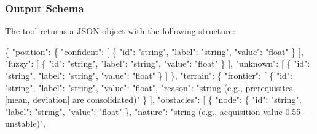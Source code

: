 \documentclass[
]{article}
\newenvironment{Shaded}{}{}
\newcommand{\DataTypeTok}[1]{\textcolor[rgb]{0.56,0.13,0.00}{#1}}
\newcommand{\FunctionTok}[1]{\textcolor[rgb]{0.02,0.16,0.49}{#1}}
\newcommand{\OtherTok}[1]{\textcolor[rgb]{0.00,0.44,0.13}{#1}}
\newcommand{\StringTok}[1]{\textcolor[rgb]{0.25,0.44,0.63}{#1}}
\begin{document}
\subsubsection{Output Schema}\label{output-schema}

The tool returns a JSON object with the following structure:

\begin{Shaded}
\begin{Highlighting}[]
\FunctionTok{\{}
  \DataTypeTok{"position"}\FunctionTok{:} \FunctionTok{\{}
    \DataTypeTok{"confident"}\FunctionTok{:} \OtherTok{[} \FunctionTok{\{} \DataTypeTok{"id"}\FunctionTok{:} \StringTok{"string"}\FunctionTok{,} \DataTypeTok{"label"}\FunctionTok{:} \StringTok{"string"}\FunctionTok{,} \DataTypeTok{"value"}\FunctionTok{:} \StringTok{"float"} \FunctionTok{\}} \OtherTok{]}\FunctionTok{,}
    \DataTypeTok{"fuzzy"}\FunctionTok{:}     \OtherTok{[} \FunctionTok{\{} \DataTypeTok{"id"}\FunctionTok{:} \StringTok{"string"}\FunctionTok{,} \DataTypeTok{"label"}\FunctionTok{:} \StringTok{"string"}\FunctionTok{,} \DataTypeTok{"value"}\FunctionTok{:} \StringTok{"float"} \FunctionTok{\}} \OtherTok{]}\FunctionTok{,}
    \DataTypeTok{"unknown"}\FunctionTok{:}   \OtherTok{[} \FunctionTok{\{} \DataTypeTok{"id"}\FunctionTok{:} \StringTok{"string"}\FunctionTok{,} \DataTypeTok{"label"}\FunctionTok{:} \StringTok{"string"}\FunctionTok{,} \DataTypeTok{"value"}\FunctionTok{:} \StringTok{"float"} \FunctionTok{\}} \OtherTok{]}
  \FunctionTok{\},}
  \DataTypeTok{"terrain"}\FunctionTok{:} \FunctionTok{\{}
    \DataTypeTok{"frontier"}\FunctionTok{:} \OtherTok{[}
      \FunctionTok{\{}
        \DataTypeTok{"id"}\FunctionTok{:} \StringTok{"string"}\FunctionTok{,}
        \DataTypeTok{"label"}\FunctionTok{:} \StringTok{"string"}\FunctionTok{,}
        \DataTypeTok{"value"}\FunctionTok{:} \StringTok{"float"}\FunctionTok{,}
        \DataTypeTok{"reason"}\FunctionTok{:} \StringTok{"string (e.g., \textquotesingle{}prerequisites [mean, deviation] are consolidated\textquotesingle{})"}
      \FunctionTok{\}}
    \OtherTok{]}\FunctionTok{,}
    \DataTypeTok{"obstacles"}\FunctionTok{:} \OtherTok{[}
      \FunctionTok{\{}
        \DataTypeTok{"node"}\FunctionTok{:} \FunctionTok{\{} \DataTypeTok{"id"}\FunctionTok{:} \StringTok{"string"}\FunctionTok{,} \DataTypeTok{"label"}\FunctionTok{:} \StringTok{"string"}\FunctionTok{,} \DataTypeTok{"value"}\FunctionTok{:} \StringTok{"float"} \FunctionTok{\},}
        \DataTypeTok{"nature"}\FunctionTok{:} \StringTok{"string (e.g., \textquotesingle{}acquisition value 0.55 — unstable\textquotesingle{})"}\FunctionTok{,}

\end{Highlighting}
\end{Shaded}
\end{document}
